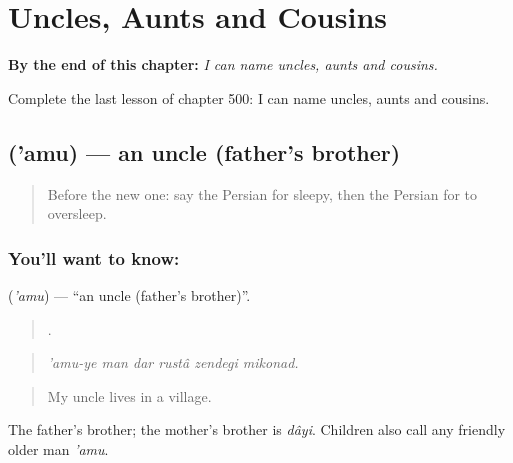 
\chapter{Uncles, Aunts and Cousins}
\label{ch:fa-uncles-aunts-and-cousins}

\begin{chapteropening}
\textbf{By the end of this chapter:} \emph{I can name uncles, aunts and cousins.}

Complete the last lesson of chapter 500: I can name uncles, aunts and cousins.
\end{chapteropening}

\section[\texorpdfstring{\fa{عمو} ('amu)}{عمو ('amu)}]{ ('amu) — an uncle (father's brother)}

\label{lesson:FA-C500-amu}



\begin{quote}
Before the new one: say the Persian for sleepy, then the Persian for to oversleep.
\end{quote}

\subsection*{You'll want to know: }
\textbf{} (\emph{'amu}) — \textquotedblleft{}an uncle (father's brother)\textquotedblright{}.

\begin{quote}
     .
\end{quote}

\begin{quote}
\emph{'amu-ye man dar rustâ zendegi mikonad.}
\end{quote}

\begin{quote}
My uncle lives in a village.
\end{quote}

The father's brother; the mother's brother is \emph{dâyi}. Children also call any friendly older man \emph{'amu}.

